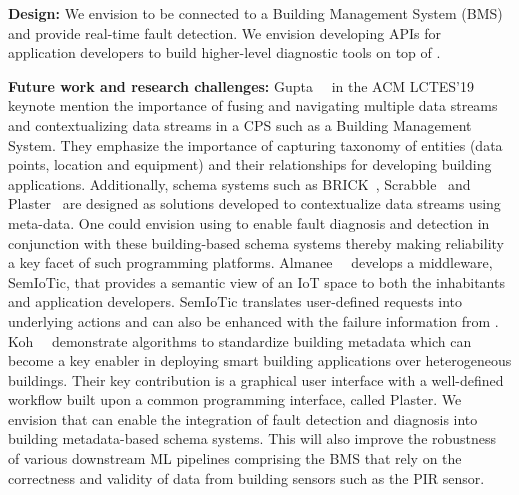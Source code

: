 \noindent\textbf{Design:} We envision \sol to be connected to a Building Management System (BMS) and provide real-time fault detection. We envision developing APIs for application developers to build higher-level diagnostic tools on top of \sol.

\noindent \textbf{Future work and research challenges:} Gupta~\etal~\cite{Gupta2019NewMA} in the ACM LCTES'19 keynote mention the importance of fusing and navigating multiple data streams and contextualizing data streams in a CPS such as a Building Management System. They emphasize the importance of capturing taxonomy of entities (\eg data points, location and equipment) and their relationships for developing building applications. Additionally, schema systems such as BRICK~\cite{balaji2016brick}, Scrabble~\cite{10.1145/3276774.3276795} and Plaster~\cite{10.1145/3276774.3276794} are designed as solutions developed to contextualize data streams using meta-data. One could envision using \sol to enable fault diagnosis and detection in conjunction with these building-based schema systems thereby making reliability a key facet of such programming platforms. Almanee~\etal~\cite{almanee2019demo} develops a middleware, SemIoTic, that provides a semantic view of an IoT space to both the inhabitants and application developers. SemIoTic translates user-defined requests into underlying actions and can also be enhanced with the failure information from \sol. Koh~\etal~\cite{koh2019interactive} demonstrate algorithms to standardize building metadata which can become a key enabler in deploying smart building applications over heterogeneous buildings. Their key contribution is a graphical user interface with a well-defined workflow built upon a common programming interface, called Plaster. We envision that \sol can enable the integration of fault detection and diagnosis into building metadata-based schema systems. This will also improve the robustness of various downstream ML pipelines comprising the BMS that rely on the correctness and validity of data from building sensors such as the PIR sensor.



